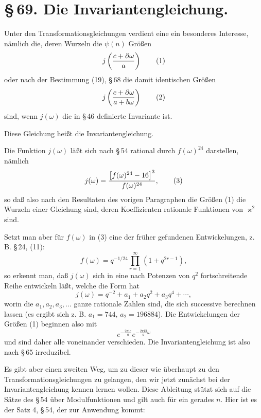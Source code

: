 \documentclass[11pt]{article}
\providecommand{\ii}{\mathrm{i}}
\begin{document}
\section*{\S\,69. Die Invariantengleichung.}

Unter den Transformationsgleichungen verdient eine ein besonderes Interesse, nämlich die,
deren Wurzeln die $\psi(n)$ Größen
\begin{equation}
 j\left({c+\partial\omega\over a}\right)
\tag{1}
\end{equation}
oder nach der Bestimmung (19), \S\,68 die damit identischen Größen
\begin{equation}
 j\left({c+\partial\omega\over a+b\omega}\right)
\tag{2}
\end{equation}
sind, wenn $j(\omega)$ die in \S\,46 definierte Invariante ist.

Diese Gleichung heißt die Invariantengleichung.

Die Funktion $j(\omega)$ läßt sich nach \S\,54 rational durch $f(\omega)^{24}$ darstellen,
nämlich
\begin{equation}
 j(\omega)={\bigl[f(\omega)^{24}-16\bigr]^3\over f(\omega)^{24}},
\tag{3}
\end{equation}
so daß also nach den Resultaten des vorigen Paragraphen die Größen (1) die Wurzeln einer
Gleichung sind, deren Koeffizienten rationale Funktionen von $\varkappa^2$ sind.

Setzt man aber für $f(\omega)$ in (3) eine der früher gefundenen Entwickelungen, z. B.
\S\,24, (11):
\[
 f(\omega)=q^{-1/24}\prod_{r=1}^{\infty}(1+q^{2r-1}),
\]
so erkennt man, daß $j(\omega)$ sich in eine nach Potenzen von $q^2$ fortschreitende Reihe
entwickeln läßt, welche die Form hat
\begin{equation}
 j(\omega)=q^{-2}+a_1+a_2q^2+a_3q^4+\cdots,
\tag{4}
\end{equation}
worin die $a_1,a_2,a_3,\ldots$ ganze rationale Zahlen sind, die sich successive berechnen
lassen (es ergibt sich z. B. $a_1=744$, $a_2=196884$). Die Entwickelungen der Größen
(1) beginnen also mit
\begin{equation}
 e^{-\frac{2\pi\ii c}{a}}e^{-\frac{2\pi\ii\partial}{a}\omega}
\tag{5}
\end{equation}
und sind daher alle voneinander verschieden. Die Invariantengleichung ist also nach
\S\,65 irreduzibel.

Es gibt aber einen zweiten Weg, um zu dieser wie überhaupt zu den Transformationsgleichungen
zu gelangen, den wir jetzt zunächst bei der Invariantengleichung kennen lernen wollen. Diese
Ableitung stützt sich auf die Sätze des \S\,54 über Modulfunktionen und gilt auch für ein
gerades $n$. Hier ist es der Satz 4, \S\,54, der zur Anwendung kommt:
\end{document}
